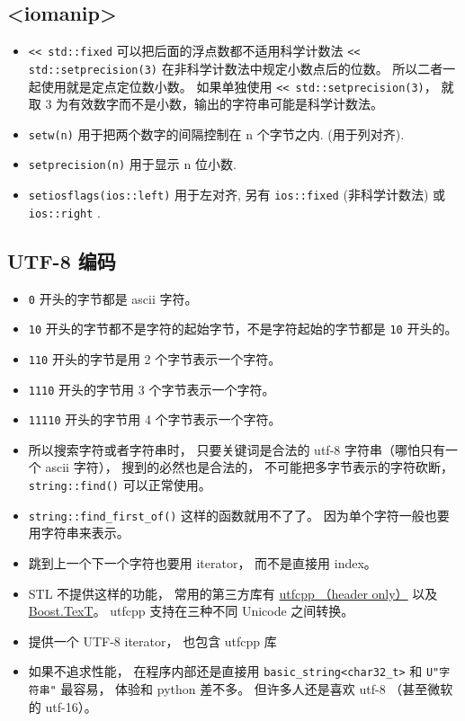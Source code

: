 \subsection{<iomanip>}
\begin{itemize}
\item \verb`<< std::fixed` 可以把后面的浮点数都不适用科学计数法 \verb`<< std::setprecision(3)` 在非科学计数法中规定小数点后的位数。 所以二者一起使用就是定点定位数小数。 如果单独使用 \verb`<< std::setprecision(3)`， 就取 3 为有效数字而不是小数，输出的字符串可能是科学计数法。
\item \verb`setw(n)` 用于把两个数字的间隔控制在 n 个字节之内. (用于列对齐).
\item \verb`setprecision(n)` 用于显示 n 位小数.
\item \verb`setiosflags(ios::left)` 用于左对齐, 另有 \verb`ios::fixed` (非科学计数法) 或 \verb`ios::right` .
\end{itemize}

\subsection{UTF-8 编码}

\begin{itemize}
\item \verb`0` 开头的字节都是 ascii 字符。
\item \verb`10` 开头的字节都不是字符的起始字节，不是字符起始的字节都是 \verb`10` 开头的。
\item \verb`110` 开头的字节是用 2 个字节表示一个字符。
\item \verb`1110` 开头的字节用 3 个字节表示一个字符。
\item \verb`11110` 开头的字节用 4 个字节表示一个字符。
\item 所以搜索字符或者字符串时， 只要关键词是合法的 utf-8 字符串（哪怕只有一个 ascii 字符）， 搜到的必然也是合法的， 不可能把多字节表示的字符砍断， \verb`string::find()` 可以正常使用。
\item \verb`string::find_first_of()` 这样的函数就用不了了。 因为单个字符一般也要用字符串来表示。
\item 跳到上一个下一个字符也要用 iterator， 而不是直接用 index。
\item STL 不提供这样的功能， 常用的第三方库有 \href{https://github.com/nemtrif/utfcpp}{utfcpp （header only）} 以及 \href{https://tzlaine.github.io/text/doc/html/index.html}{Boost.TexT}。 utfcpp 支持在三种不同 Unicode 之间转换。
\item {} 提供一个 UTF-8 iterator， 也包含 utfcpp 库
\item 如果不追求性能， 在程序内部还是直接用 \verb`basic_string<char32_t>` 和 \verb`U"字符串"` 最容易， 体验和 python 差不多。 但许多人还是喜欢 utf-8 （甚至微软的 utf-16）。
\end{itemize}

